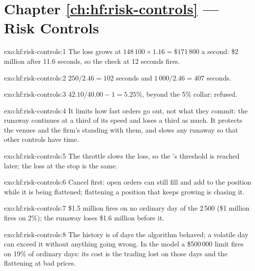 \section*{Chapter \ref{ch:hf:risk-controls} --- Risk Controls}

\begin{solution}{exo:hf:risk-controls:1}
The loss grows at $148\,100\times1.16=\$171\,800$ a second: \$2 million after 11.6 seconds, so the check at 12 seconds fires.
\end{solution}

\begin{solution}{exo:hf:risk-controls:2}
$250/2.46=102$ seconds and $1\,000/2.46=407$ seconds.
\end{solution}

\begin{solution}{exo:hf:risk-controls:3}
$42.10/40.00-1=5.25\%$, beyond the 5\% collar: refused.
\end{solution}

\begin{solution}{exo:hf:risk-controls:4}
It limits how fast orders go out, not what they commit: the runaway continues at a third of its speed and loses a third as much. It protects the
venues and the firm's standing with them, and slows any runaway so that other controls have time.
\end{solution}

\begin{solution}{exo:hf:risk-controls:5}
The throttle slows the loss, so the 's threshold is reached later; the loss at the stop is the same.
\end{solution}

\begin{solution}{exo:hf:risk-controls:6}
Cancel first: open orders can still fill and add to the position while it is being flattened; flattening a position that keeps growing is chasing it.
\end{solution}

\begin{solution}{exo:hf:risk-controls:7}
\$1.5 million fires on no ordinary day of the 2\,500 (\$1 million fires on 2\%); the runaway loses \$1.6 million before it.
\end{solution}

\begin{solution}{exo:hf:risk-controls:8}
The history is of days the algorithm behaved; a volatile day can exceed it without anything going wrong. In the model a \$500\,000 limit fires on
19\% of ordinary days: its cost is the trading lost on those days and the flattening at bad prices.
\end{solution}

